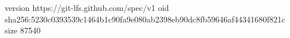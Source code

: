 version https://git-lfs.github.com/spec/v1
oid sha256:5230c0393539c1464b1c90fa9e080ab2398eb90dc8fb59646af44341680f821c
size 87540
